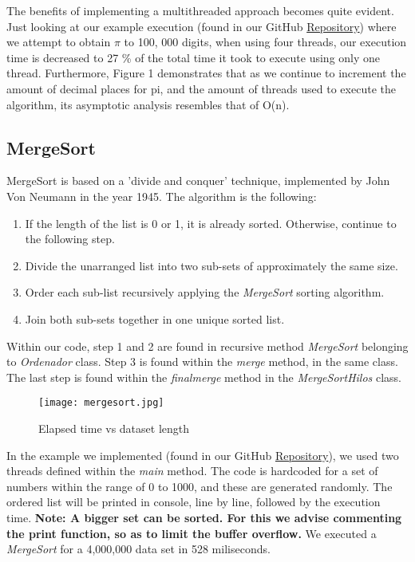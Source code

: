 \documentclass[10pt,a4paper]{article}
\theoremstyle{definition}
\begin{document}
The benefits of implementing a multithreaded approach becomes quite evident. Just looking at our example execution (found in our GitHub \href{https://github.com/ezevallos/CC462_EjemplosConcurrencia}{Repository}) where we attempt to obtain \(\pi\) to 100, 000 digits, when using four threads, our execution time is decreased to 27 \% of the total time it took to execute using only one thread. Furthermore, Figure 1 demonstrates that as we continue to increment the amount of decimal places for pi, and the amount of threads used to execute the algorithm, its asymptotic analysis resembles that of O(n).

\subsection{MergeSort}
MergeSort is based on a 'divide and conquer' technique, implemented by John Von Neumann in the year 1945. The algorithm is the following:
\begin{enumerate}
    \item If the length of the list is 0 or 1, it is already sorted. Otherwise, continue to the following step.
    \item Divide the unarranged list into two sub-sets of approximately the same size.
    \item Order each sub-list recursively applying the \emph{MergeSort} sorting algorithm.
    \item Join both sub-sets together in one unique sorted list.
\end{enumerate}
Within our code, step 1 and 2 are found in recursive method \emph{MergeSort} belonging to \emph{Ordenador} class. Step 3 is found within the \emph{merge} method, in the same class. The last step is found within the \emph{finalmerge} method in the \emph{MergeSortHilos} class.

\begin{figure}[H]
    \centering
    \texttt{[image: mergesort.jpg]}
    \caption{Elapsed time vs dataset length}
    \label{fig:mergesort}
\end{figure}
In the example we implemented (found in our GitHub \href{https://github.com/ezevallos/CC462_EjemplosConcurrencia}{Repository}), we used two threads defined within the \emph{main} method. The code is hardcoded for a set of numbers within the range of 0 to 1000, and these are generated randomly. The ordered list will be printed in console, line by line, followed by the execution time. \textbf{Note: A bigger set can be sorted. For this we advise commenting the print function, so as to limit the buffer overflow.} We executed a \emph{MergeSort} for a 4,000,000 data set in 528 miliseconds. 
\end{document}
